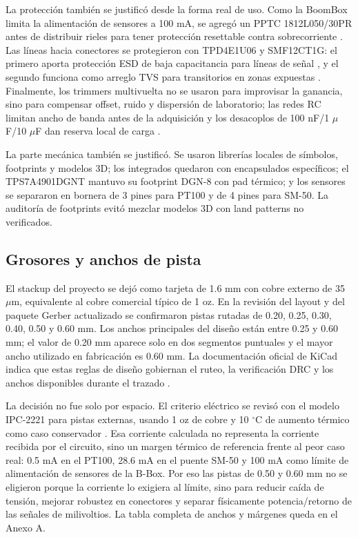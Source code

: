 \documentclass[conference]{IEEEtran}
\begin{document}
La protección también se justificó desde la forma real de uso. Como la BoomBox limita la alimentación de sensores a 100 mA, se agregó un PPTC 1812L050/30PR antes de distribuir rieles para tener protección resettable contra sobrecorriente \cite{littelfuse1812}. Las líneas hacia conectores se protegieron con TPD4E1U06 y SMF12CT1G: el primero aporta protección ESD de baja capacitancia para líneas de señal \cite{tpd4e1u06}, y el segundo funciona como arreglo TVS para transitorios en zonas expuestas \cite{smf12}. Finalmente, los trimmers multivuelta no se usaron para improvisar la ganancia, sino para compensar offset, ruido y dispersión de laboratorio; las redes RC limitan ancho de banda antes de la adquisición y los desacoplos de 100 nF/1 $\mu$F/10 $\mu$F dan reserva local de carga \cite{bourns3296}.

La parte mecánica también se justificó. Se usaron librerías locales de símbolos, footprints y modelos 3D; los integrados quedaron con encapsulados específicos; el TPS7A4901DGNT mantuvo su footprint DGN-8 con pad térmico; y los sensores se separaron en bornera de 3 pines para PT100 y de 4 pines para SM-50. La auditoría de footprints evitó mezclar modelos 3D con land patterns no verificados.

\subsection{Grosores y anchos de pista}

El stackup del proyecto se dejó como tarjeta de 1.6 mm con cobre externo de 35 $\mu$m, equivalente al cobre comercial típico de 1 oz. En la revisión del layout y del paquete Gerber actualizado se confirmaron pistas rutadas de 0.20, 0.25, 0.30, 0.40, 0.50 y 0.60 mm. Los anchos principales del diseño están entre 0.25 y 0.60 mm; el valor de 0.20 mm aparece solo en dos segmentos puntuales y el mayor ancho utilizado en fabricación es 0.60 mm. La documentación oficial de KiCad indica que estas reglas de diseño gobiernan el ruteo, la verificación DRC y los anchos disponibles durante el trazado \cite{kicad_pcbnew}.

La decisión no fue solo por espacio. El criterio eléctrico se revisó con el modelo IPC-2221 para pistas externas, usando 1 oz de cobre y 10 $^\circ$C de aumento térmico como caso conservador \cite{digikey_trace}. Esa corriente calculada no representa la corriente recibida por el circuito, sino un margen térmico de referencia frente al peor caso real: 0.5 mA en el PT100, 28.6 mA en el puente SM-50 y 100 mA como límite de alimentación de sensores de la B-Box. Por eso las pistas de 0.50 y 0.60 mm no se eligieron porque la corriente lo exigiera al límite, sino para reducir caída de tensión, mejorar robustez en conectores y separar físicamente potencia/retorno de las señales de milivoltios. La tabla completa de anchos y márgenes queda en el Anexo A.
\end{document}

